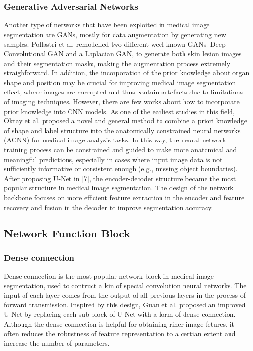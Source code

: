 \subsubsection{Generative Adversarial Networks}
\label{subsubsec:gan}
Another type of networks that have been exploited in medical image segmentation are GANs, mostly for data augmentation by generating new samples. Pollastri et al. remodelled two different weel known GANs, Deep Convolutional GAN and a Laplacian GAN, to generate both skin lesion images and their segmentation masks, making the augmentation process extremely straighforward.
In addition, the incorporation of the prior knowledge about
organ shape and position may be crucial for improving medical
image segmentation effect, where images are corrupted and
thus contain artefacts due to limitations of imaging techniques.
However, there are few works about how to incorporate prior
knowledge into CNN models. As one of the earliest studies in this field, Oktay et al. proposed a novel and general
method to combine a priori knowledge of shape and label
structure into the anatomically constrained neural networks
(ACNN) for medical image analysis tasks. In this way, the neural network training process can be constrained and guided to
make more anatomical and meaningful predictions, especially
in cases where input image data is not sufficiently informative or consistent enough (e.g., missing object boundaries).\\

After proposing U-Net in [7], the encoder-decoder structure
became the most popular structure in medical image segmentation. The design of the network backbone focuses on more
efficient feature extraction in the encoder and feature recovery
and fusion in the decoder to improve segmentation accuracy.

\subsection{Network Function Block}
\subsubsection{Dense connection}
Dense connection is the most popular network block in medical image
segmentation, used to contruct a kin of special convolution neural networks. The
input of each layer comes from the output of all previous layers in the process
of forward transmission. Inspired by this design, Guan et al. proposed an
improved U-Net by replacing each sub-block of U-Net with a form of dense
connection. Although the dense connection is helpful for obtaining riher image
fetures, it often reduces the robustness of feature representation to a certian
extent and increase the number of parameters.

